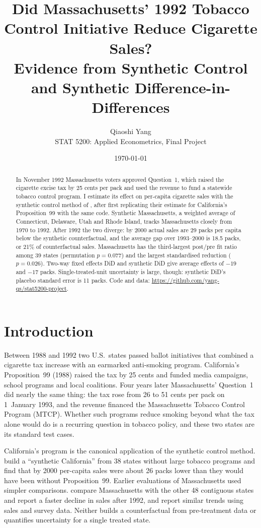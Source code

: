 \documentclass[11pt]{article}
\title{Did Massachusetts' 1992 Tobacco Control Initiative Reduce Cigarette Sales?\\
  \large Evidence from Synthetic Control and Synthetic Difference-in-Differences}
\author{Qiaoshi Yang\\ STAT 5200: Applied Econometrics, Final Project}
\date{\today}
\begin{document}
\maketitle

\begin{abstract}
In November 1992 Massachusetts voters approved Question~1, which raised the
cigarette excise tax by 25 cents per pack and used the revenue to fund a
statewide tobacco control program. I estimate its effect on per-capita
cigarette sales with the synthetic control method of \citet{adh2010}, after
first replicating their estimate for California's Proposition~99 with the same
code. Synthetic Massachusetts, a weighted average of Connecticut, Delaware, Utah
and Rhode Island, tracks Massachusetts closely from 1970 to 1992. After 1992
the two diverge: by 2000 actual sales are 29 packs per capita below the
synthetic counterfactual, and the average gap over 1993--2000 is 18.5 packs, or
21\% of counterfactual sales. Massachusetts has the third-largest post/pre fit
ratio among 39 states (permutation $p = 0.077$) and the largest standardised
reduction ($p = 0.026$). Two-way fixed effects DiD and synthetic DiD give
average effects of $-19$ and $-17$ packs. Single-treated-unit uncertainty is
large, though: synthetic DiD's placebo standard error is 11 packs.
Code and data: \url{https://github.com/yang-qs/stat5200-project}.
\end{abstract}

\section{Introduction}

Between 1988 and 1992 two U.S.\ states passed ballot initiatives that combined
a cigarette tax increase with an earmarked anti-smoking program. California's
Proposition~99 (1988) raised the tax by 25 cents and funded media campaigns,
school programs and local coalitions. Four years later Massachusetts' Question~1
did nearly the same thing: the tax rose from 26 to 51 cents per pack on
1~January 1993, and the revenue financed the Massachusetts Tobacco Control
Program (MTCP). Whether such programs reduce smoking beyond what the tax alone
would do is a recurring question in tobacco policy, and these two states are its
standard test cases.

California's program is the canonical application of the synthetic control
method. \citet{adh2010} build a ``synthetic California'' from 38 states without
large tobacco programs and find that by 2000 per-capita sales were about 26
packs lower than they would have been without Proposition~99. Earlier
evaluations of Massachusetts used simpler comparisons. \citet{harris1996}
compare Massachusetts with the other 48 contiguous states and report a faster
decline in sales after 1992, and \citet{biener2000} report similar trends using
sales and survey data. Neither builds a counterfactual from pre-treatment data
or quantifies uncertainty for a single treated state.
\end{document}
